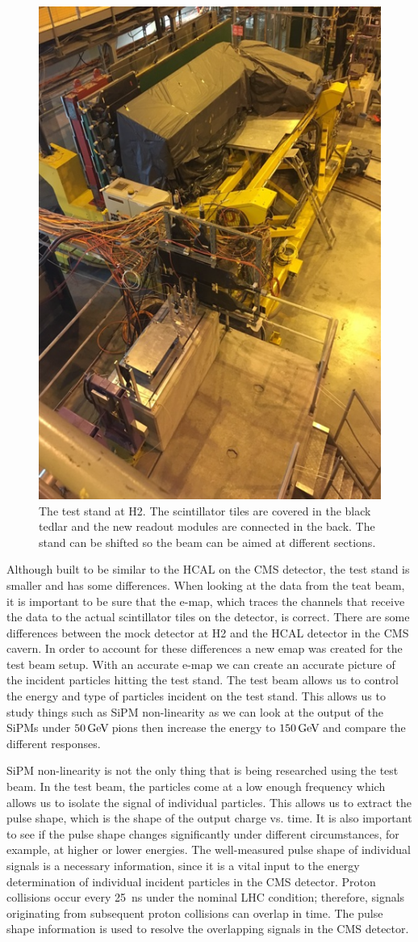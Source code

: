 \begin{figure}
\centering
\includegraphics[width=0.6\linewidth]{Figures/Teststand.png}
\caption{The test stand at H2. The scintillator tiles are covered in the black tedlar and the new readout modules are connected in the back. The stand can be shifted so the beam can be aimed at different sections.}
\label{fig:stand}
\end{figure}

Although built to be similar to the HCAL on the CMS detector, the test stand is smaller and has some differences. When looking at the data from the teat beam, it is important to be sure that the e-map, which traces the channels that receive the data to the actual scintillator tiles on the detector, is correct. There are some differences between the mock detector at H2 and the HCAL detector in the CMS cavern. In order to account for these differences a new emap was created for the test beam setup. With an accurate e-map we can create an accurate picture of the incident particles hitting the test stand. The test beam allows us to control the energy and type of particles incident on the test stand. This allows us to study things such as SiPM non-linearity as we can look at the output of the SiPMs under $50 {\,\text{Ge\hspace{-.08em}V\hspace{-0.16em}}}$ pions then increase the energy to $150 {\,\text{Ge\hspace{-.08em}V\hspace{-0.16em}}}$ and compare the different responses. 

SiPM non-linearity is not the only thing that is being researched using the test beam. In the test beam, the particles come at a low enough frequency which allows us to isolate the signal of individual particles. This allows us to extract the pulse shape, which is the shape of the output charge vs. time. It is also important to see if the pulse shape changes significantly under different circumstances, for example, at higher or lower energies. The well-measured pulse shape of individual signals is a necessary information, since it is a vital input to the energy determination of individual incident particles in the CMS detector. Proton collisions occur every 25~ns under the nominal LHC condition; therefore, signals originating from subsequent proton collisions can overlap in time. The pulse shape information is used to resolve the overlapping signals in the CMS detector.

